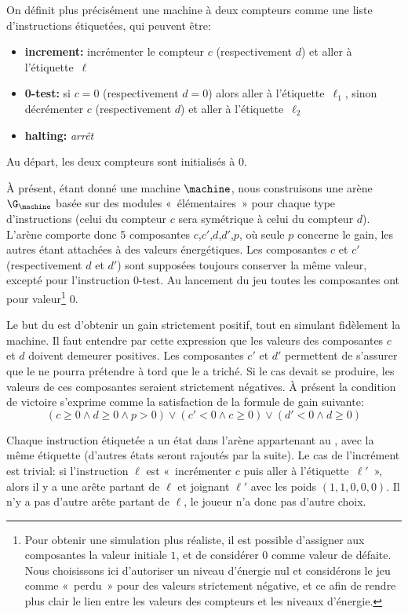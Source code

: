 On définit plus précisément une machine à deux compteurs comme une liste d'instructions étiquetées, qui peuvent être:
\begin{itemize}
    \item \textbf{increment:} incrémenter le compteur $c$ (respectivement $d$) et aller à l'étiquette~$\ell$
    \item \textbf{0-test:} si $c=0$ (respectivement $d=0$) alors aller à l'étiquette~$\ell_1$, sinon décrémenter $c$ (respectivement $d$) et aller à l'étiquette~$\ell_2$
    \item \textbf{halting:} \emph{arrêt}
\end{itemize}
Au départ, les deux compteurs sont initialisés à $0$.

À présent, étant donné une machine $\machine$, nous construisons une arène $\G_\machine$ basée sur des modules « élémentaires » pour chaque type d'instructions (celui du compteur $c$ sera symétrique à celui du compteur $d$).
L'arène comporte donc 5 composantes $c$,$c'$,$d$,$d'$,$p$, où seule $p$ concerne le gain, les autres étant attachées à des valeurs énergétiques.
Les composantes $c$ et $c'$ (respectivement $d$ et $d'$) sont supposées toujours conserver la même valeur, excepté pour l'instruction $0$-test.
Au lancement du jeu toutes les composantes ont pour valeur\footnote{Pour obtenir une simulation plus réaliste, il est possible d'assigner aux composantes la valeur initiale $1$, et de considérer $0$ comme valeur de défaite. Nous choisissons ici d'autoriser un niveau d'énergie nul et considérons le jeu comme « perdu » pour des valeurs strictement négative, et ce afin de rendre plus clair le lien entre les valeurs des compteurs et les niveaux d'énergie.} $0$.

Le but du \jo est d'obtenir un gain strictement positif, tout en simulant fidèlement la machine.
Il faut entendre par cette expression que les valeurs des composantes $c$ et $d$ doivent demeurer positives.
Les composantes $c'$ et $d'$ permettent de s'assurer que le \ji ne pourra prétendre à tord que le \jo a triché.
Si le cas devait se produire, les valeurs de ces composantes seraient strictement négatives.
À présent la condition de victoire s'exprime comme la satisfaction de la formule de gain suivante:
\[(c\geq0 \wedge d\geq0 \wedge p>0) \vee (c'<0 \wedge c\geq0) \vee (d'<0 \wedge d\geq0)\]

Chaque instruction étiquetée a un état dans l'arène appartenant au \jo, avec la même étiquette (d'autres états seront rajoutés par la suite).
Le cas de l'incrément est trivial: si l'instruction $\ell$ est « incrémenter $c$ puis aller à l'étiquette~$\ell'$ », alors il y a une arête partant de $\ell$ et joignant $\ell'$ avec les poids $(1,1,0,0,0)$.
Il n'y a pas d'autre arête partant de $\ell$, le joueur n'a donc pas d'autre choix.


